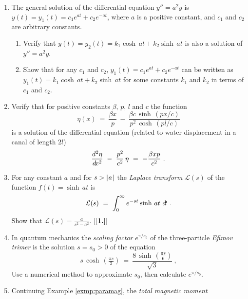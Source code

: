 {\begin{enumerate}[\bfseries 1.]
\begin{enumerate}[\bfseries (a)]
  \item Use $\ddx\,(\coth^{-1} x) = \frac{1}{1-x^2}$ for $\abs{x} > 1$ to show
   that $I = \coth^{-1} 3 \;-\; \coth^{-1} 2$.
  \item Use the substitution $u = \frac{1}{x}$ in the integral, then use
   $\ddx\,(\tanh^{-1} x) = \frac{1}{1-x^2}$ for $\abs{x} < 1$ to show
   that $I = \tanh^{-1} \frac{1}{3} \;-\; \tanh^{-1} \frac{1}{2}$. Is this
   answer equivalent to the answer from part (a)? Explain.
 \end{enumerate}
[{[\bfseries 1.]}]
 \item The general solution of the differential equation $y''=a^2y$ is
  $y(t) = y_1(t) = c_1e^{at} + c_2e^{-at}$, where $a$ is a positive constant,
  and $c_1$ and $c_2$ are arbitrary constants.
 \begin{enumerate}[\bfseries (a)]
  \item Verify that $y(t) = y_2(t) = k_1\cosh\,at + k_2\sinh\,at$ is also a
   solution of $y''=a^2y$.
  \item Show that for any $c_1$ and $c_2$, $y_1(t) = c_1e^{at} + c_2e^{-at}$ can
  be written as $y_1(t) = k_1\cosh\,at + k_2\sinh\,at$ for some
  constants $k_1$ and $k_2$ in terms of $c_1$ and $c_2$.
 \end{enumerate}
 \item Verify that for positive constants $\beta$, $p$, $l$ and $c$ the function
\[
\eta(x) ~=~ \frac{\beta x}{p} ~-~ \frac{\beta c\,\sinh\,(px/c)}{p^2 \,\cosh\,(pl/c)}
\]
is a solution of the differential equation (related to water
displacement in a canal of length $2l$)
\[
\frac{d^2 \eta}{d\!x^2} ~-~ \frac{p^2}{c^2}\,\eta ~=~ -\frac{\beta xp}{c^2} ~.
\]
 \item For any constant $a$ and for $s > \lvert\mspace{1mu}a\mspace{1mu}\rvert$ the
  \emph{Laplace transform} $\mathcal{L}(s)$ of the
  function $f(t) = \sinh\,at$ is
\[
\mathcal{L}(s) ~=~ \int_0^{\infty} e^{-st} \sinh\,at~d\!t ~.
\]
Show that $\mathcal{L}(s) = \frac{a}{s^2 - a^2}$.
[{[\bfseries 1.]}]
 \item In quantum mechanics the \emph{scaling factor} $e^{\pi/s_0}$ of the
  three-particle \emph{Efimov trimer} is the solution
  $s=s_0 > 0$ of the equation
\[
s\,\cosh\,\left(\tfrac{\pi s}{2}\right) ~=~
\frac{8\,\sinh\,\left(\tfrac{\pi s}{6}\right)}{\sqrt{3}} ~,
\]
Use a numerical method to approximate $s_0$, then calculate $e^{\pi/s_0}$.
 \item Continuing Example \ref{exmp:paramag}, the \emph{total magnetic moment}

\end{enumerate}}
